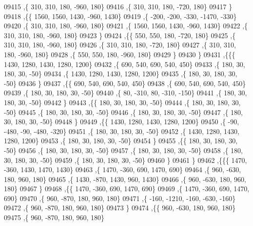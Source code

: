 \begin{DoxyCode}
09415     ,\{   310,   310,   180,  -960,   180\}
09416     ,\{   310,   310,   180,  -720,   180\}
09417     \}
09418    ,\{\{  1560,  1560,  1430,  -960,  1430\}
09419     ,\{  -200,  -200,  -330, -1470,  -330\}
09420     ,\{   310,   310,   180,  -960,   180\}
09421     ,\{  1560,  1560,  1430,  -960,  1430\}
09422     ,\{   310,   310,   180,  -960,   180\}
09423     \}
09424    ,\{\{   550,   550,   180,  -720,   180\}
09425     ,\{   310,   310,   180,  -960,   180\}
09426     ,\{   310,   310,   180,  -720,   180\}
09427     ,\{   310,   310,   180,  -960,   180\}
09428     ,\{   550,   550,   180,  -960,   180\}
09429     \}
09430    \}
09431   ,\{\{\{  1430,  1280,  1430,  1280,  1200\}
09432     ,\{   690,   540,   690,   540,   450\}
09433     ,\{   180,    30,   180,    30,   -50\}
09434     ,\{  1430,  1280,  1430,  1280,  1200\}
09435     ,\{   180,    30,   180,    30,   -50\}
09436     \}
09437    ,\{\{   690,   540,   690,   540,   450\}
09438     ,\{   690,   540,   690,   540,   450\}
09439     ,\{   180,    30,   180,    30,   -50\}
09440     ,\{    80,  -310,    80,  -310,  -150\}
09441     ,\{   180,    30,   180,    30,   -50\}
09442     \}
09443    ,\{\{   180,    30,   180,    30,   -50\}
09444     ,\{   180,    30,   180,    30,   -50\}
09445     ,\{   180,    30,   180,    30,   -50\}
09446     ,\{   180,    30,   180,    30,   -50\}
09447     ,\{   180,    30,   180,    30,   -50\}
09448     \}
09449    ,\{\{  1430,  1280,  1430,  1280,  1200\}
09450     ,\{   -90,  -480,   -90,  -480,  -320\}
09451     ,\{   180,    30,   180,    30,   -50\}
09452     ,\{  1430,  1280,  1430,  1280,  1200\}
09453     ,\{   180,    30,   180,    30,   -50\}
09454     \}
09455    ,\{\{   180,    30,   180,    30,   -50\}
09456     ,\{   180,    30,   180,    30,   -50\}
09457     ,\{   180,    30,   180,    30,   -50\}
09458     ,\{   180,    30,   180,    30,   -50\}
09459     ,\{   180,    30,   180,    30,   -50\}
09460     \}
09461    \}
09462   ,\{\{\{  1470,  -360,  1430,  1470,  1430\}
09463     ,\{  1470,  -360,   690,  1470,   690\}
09464     ,\{   960,  -630,   180,   960,   180\}
09465     ,\{  1430,  -870,  1430,   960,  1430\}
09466     ,\{   960,  -630,   180,   960,   180\}
09467     \}
09468    ,\{\{  1470,  -360,   690,  1470,   690\}
09469     ,\{  1470,  -360,   690,  1470,   690\}
09470     ,\{   960,  -870,   180,   960,   180\}
09471     ,\{  -160, -1210,  -160,  -630,  -160\}
09472     ,\{   960,  -870,   180,   960,   180\}
09473     \}
09474    ,\{\{   960,  -630,   180,   960,   180\}
09475     ,\{   960,  -870,   180,   960,   180\}

\end{DoxyCode}
